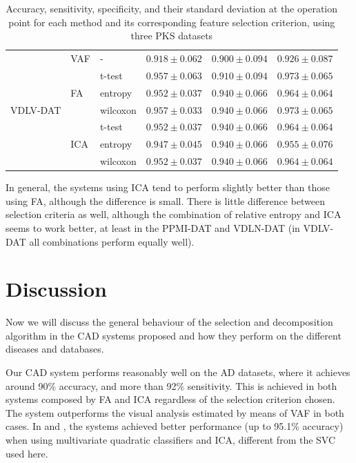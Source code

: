 \begin{table}
\begin{tabularx}{\linewidth}{Xllccc}
		\midrule
		\multirow{7}{1.7cm}{VDLV-DAT} & \ac{VAF} & - & $ 0.918 \pm 0.062$ & $0.900 \pm 0.094$ & $ 0.926 \pm0.087$ \\
		\cline{2-6}
		& \multirow{3}{*}{\ac{FA}} & t-test & $ 0.957 \pm 0.063 $ & $ 0.910 \pm 0.094 $ & $ 0.973 \pm 0.065 $ \\
		&  & entropy & $ 0.952 \pm 0.037 $ & $ 0.940 \pm 0.066 $ & $ 0.964 \pm 0.064 $ \\
		&  & wilcoxon & $ 0.957 \pm 0.033 $ & $ 0.940 \pm 0.066 $ & $ 0.973 \pm 0.065 $ \\
		\cline{2-6}
		& \multirow{3}{*}{\ac{ICA}} & t-test & $ 0.952 \pm 0.037 $ & $ 0.940 \pm 0.066 $ & $ 0.964 \pm 0.064 $ \\
		&  & entropy & $ 0.947 \pm 0.045 $ & $ 0.940 \pm 0.066 $ & $ 0.955 \pm 0.076 $ \\
		&  & wilcoxon & $ 0.952 \pm 0.037 $ & $ 0.940 \pm 0.066 $ & $ 0.964 \pm 0.064 $ \\
		\bottomrule
	\end{tabularx}
	\caption[Performance values for the Parkinson's datasets]{Accuracy, sensitivity, specificity, and their standard deviation at the operation point for each method and its corresponding feature selection criterion, using three \protect\ac{PKS} datasets }
	\label{tab:featurePKS}
\end{table} 


In general, the systems using \ac{ICA} tend to perform slightly better than those using \ac{FA}, although the difference is small. There is little difference between selection criteria as well, although the combination of relative entropy and \ac{ICA} seems to work better, at least in the PPMI-DAT and VDLN-DAT (in VDLV-DAT all combinations perform equally well). 


\FloatBarrier
\section{Discussion}
Now we will discuss the general behaviour of the selection and decomposition algorithm in the \ac{CAD} systems proposed and how they perform on the different diseases and databases. 

Our \ac{CAD} system performs reasonably well on the \ac{AD} datasets, where it achieves around 90\% accuracy, and more than 92\% sensitivity. This is achieved in both systems composed by \ac{FA} and \ac{ICA} regardless of the selection criterion chosen. The system outperforms the visual analysis estimated by means of \ac{VAF} \cite{Stoeckel04} in both cases. In \cite{Martinez201141} and \cite{Martinez-Murcia20129676}, the systems achieved better performance (up to 95.1\% accuracy) when using multivariate quadratic classifiers and \ac{ICA}, different from the \ac{SVC} used here. 

